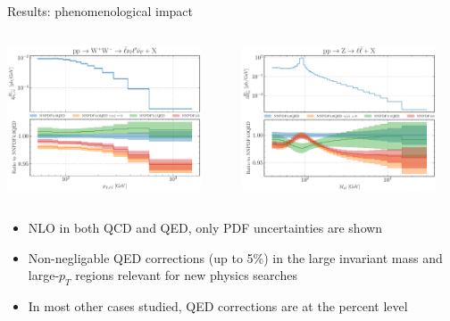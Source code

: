 \documentclass[8pt,t]{beamer}
\begin{document}
\begin{frame}{Results: phenomenological impact}
  \begin{columns}[T]
    \begin{column}{0.49\textwidth}
      \includegraphics[width=0.9\textwidth]{figures/NNPDF_WPWM_14TEV_40_PHENO-internal.pdf}
    \end{column}
    \begin{column}{0.49\textwidth}
      \includegraphics[width=0.9\textwidth]{figures/NNPDF_DY_14TEV_40_PHENO-internal.pdf}
    \end{column}
  \end{columns}

  \vspace*{1em}
  \begin{itemize}
    \item NLO in both QCD and QED, only PDF uncertainties are shown
    \item Non-negligable QED corrections (up to 5\%) in the large invariant mass and large-$p_T$ regions relevant for new physics searches
    \item In most other cases studied, QED corrections are at the percent level
  \end{itemize}
\end{frame}
\end{document}

